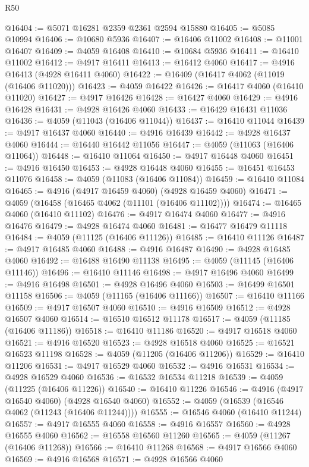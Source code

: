 \begin{lexlean}{R50}
\begin{coremodule}
@16404 := @5071 @16281 @2359 @2361 @2594 @15880
@16405 := @5085 @10994
@16406 := @10680 @5936
@16407 := @16406 @11002
@16408 := @11001 @16407
@16409 := @4059 @16408
@16410 := @10684 @5936
@16411 := @16410 @11002
@16412 := @4917 @16411
@16413 := @16412 @4060
@16417 := @4916 @16413 (@4928 @16411 @4060)
@16422 := @16409 (@16417 @4062 (@11019 (@16406 @11020)))
@16423 := @4059 @16422
@16426 := @16417 @4060 (@16410 @11020)
@16427 := @4917 @16426
@16428 := @16427 @4060
@16429 := @4916 @16428
@16431 := @4928 @16426 @4060
@16433 := @16429 @16431 @11036
@16436 := @4059 (@11043 (@16406 @11044))
@16437 := @16410 @11044
@16439 := @4917 @16437 @4060
@16440 := @4916 @16439
@16442 := @4928 @16437 @4060
@16444 := @16440 @16442 @11056
@16447 := @4059 (@11063 (@16406 @11064))
@16448 := @16410 @11064
@16450 := @4917 @16448 @4060
@16451 := @4916 @16450
@16453 := @4928 @16448 @4060
@16455 := @16451 @16453 @11076
@16458 := @4059 (@11083 (@16406 @11084))
@16459 := @16410 @11084
@16465 := @4916 (@4917 @16459 @4060) (@4928 @16459 @4060)
@16471 := @4059 (@16458 (@16465 @4062 (@11101 (@16406 @11102))))
@16474 := @16465 @4060 (@16410 @11102)
@16476 := @4917 @16474 @4060
@16477 := @4916 @16476
@16479 := @4928 @16474 @4060
@16481 := @16477 @16479 @11118
@16484 := @4059 (@11125 (@16406 @11126))
@16485 := @16410 @11126
@16487 := @4917 @16485 @4060
@16488 := @4916 @16487
@16490 := @4928 @16485 @4060
@16492 := @16488 @16490 @11138
@16495 := @4059 (@11145 (@16406 @11146))
@16496 := @16410 @11146
@16498 := @4917 @16496 @4060
@16499 := @4916 @16498
@16501 := @4928 @16496 @4060
@16503 := @16499 @16501 @11158
@16506 := @4059 (@11165 (@16406 @11166))
@16507 := @16410 @11166
@16509 := @4917 @16507 @4060
@16510 := @4916 @16509
@16512 := @4928 @16507 @4060
@16514 := @16510 @16512 @11178
@16517 := @4059 (@11185 (@16406 @11186))
@16518 := @16410 @11186
@16520 := @4917 @16518 @4060
@16521 := @4916 @16520
@16523 := @4928 @16518 @4060
@16525 := @16521 @16523 @11198
@16528 := @4059 (@11205 (@16406 @11206))
@16529 := @16410 @11206
@16531 := @4917 @16529 @4060
@16532 := @4916 @16531
@16534 := @4928 @16529 @4060
@16536 := @16532 @16534 @11218
@16539 := @4059 (@11225 (@16406 @11226))
@16540 := @16410 @11226
@16546 := @4916 (@4917 @16540 @4060) (@4928 @16540 @4060)
@16552 := @4059 (@16539 (@16546 @4062 (@11243 (@16406 @11244))))
@16555 := @16546 @4060 (@16410 @11244)
@16557 := @4917 @16555 @4060
@16558 := @4916 @16557
@16560 := @4928 @16555 @4060
@16562 := @16558 @16560 @11260
@16565 := @4059 (@11267 (@16406 @11268))
@16566 := @16410 @11268
@16568 := @4917 @16566 @4060
@16569 := @4916 @16568
@16571 := @4928 @16566 @4060

\end{coremodule}
\end{lexlean}
